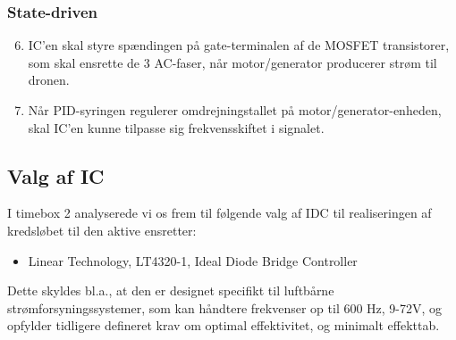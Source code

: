 \subsubsection{State-driven}
\label{sec:state-driven}
\begin{enumerate}[label=2.1.3.\arabic*]
  \setcounter{enumi}{5}
\item IC’en skal styre spændingen på gate-terminalen af de MOSFET transistorer, som skal ensrette de 3 AC-faser, når motor/generator producerer strøm til dronen.
\item Når PID-syringen regulerer omdrejningstallet på motor/generator-enheden, skal IC’en kunne tilpasse sig frekvensskiftet i signalet.
\end{enumerate}



\subsection{Valg af IC }
\label{sec:valg-af-ic}

I timebox 2 analyserede vi os frem til følgende valg af IDC til realiseringen af kredsløbet til den aktive ensretter:
\begin{itemize}
\item Linear Technology, LT4320-1, Ideal Diode Bridge Controller
\end{itemize}

Dette skyldes bl.a., at den er designet specifikt til luftbårne strømforsyningssystemer, som kan håndtere frekvenser op til 600 Hz, 9-72V, og opfylder tidligere defineret krav om optimal effektivitet, og minimalt effekttab.

\clearpage
